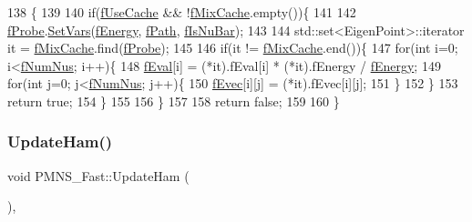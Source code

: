 \begin{DoxyCode}
138 \{
139 
140   \textcolor{keywordflow}{if}(\hyperlink{classOscProb_1_1PMNS__Base_ad28c12ef897b5555eda509ea55c99107}{fUseCache} && !\hyperlink{classOscProb_1_1PMNS__Base_a8159424f20197a3a7145fe3bf2c11176}{fMixCache}.empty())\{
141 
142     \hyperlink{classOscProb_1_1PMNS__Base_ab1fe4800ee3ae48df4fc942dce00e0d3}{fProbe}.\hyperlink{structOscProb_1_1EigenPoint_a2e293e0820715950ec8fb370e8cc9477}{SetVars}(\hyperlink{classOscProb_1_1PMNS__Base_a2800af6d436972f3e900867790c046b0}{fEnergy}, \hyperlink{classOscProb_1_1PMNS__Base_a849437aa8891fe042e86886ce8f81c6e}{fPath}, \hyperlink{classOscProb_1_1PMNS__Base_a0ebaeaefab36a3ff381c6293faedfdd6}{fIsNuBar});
143     
144     std::set<EigenPoint>::iterator it = \hyperlink{classOscProb_1_1PMNS__Base_a8159424f20197a3a7145fe3bf2c11176}{fMixCache}.find(\hyperlink{classOscProb_1_1PMNS__Base_ab1fe4800ee3ae48df4fc942dce00e0d3}{fProbe});
145 
146     \textcolor{keywordflow}{if}(it != \hyperlink{classOscProb_1_1PMNS__Base_a8159424f20197a3a7145fe3bf2c11176}{fMixCache}.end())\{
147       \textcolor{keywordflow}{for}(\textcolor{keywordtype}{int} i=0; i<\hyperlink{classOscProb_1_1PMNS__Base_a24bb74bed63569dfe88b18fa6a08060e}{fNumNus}; i++)\{
148         \hyperlink{classOscProb_1_1PMNS__Base_a6319c34d7decbb9d7d6da279c06e8c2d}{fEval}[i] = (*it).fEval[i] * (*it).fEnergy / \hyperlink{classOscProb_1_1PMNS__Base_a2800af6d436972f3e900867790c046b0}{fEnergy};
149         \textcolor{keywordflow}{for}(\textcolor{keywordtype}{int} j=0; j<\hyperlink{classOscProb_1_1PMNS__Base_a24bb74bed63569dfe88b18fa6a08060e}{fNumNus}; j++)\{
150           \hyperlink{classOscProb_1_1PMNS__Base_a87be137356c5f27ab83cab5e1298ef8f}{fEvec}[i][j] = (*it).fEvec[i][j];
151         \}
152       \}
153       \textcolor{keywordflow}{return} \textcolor{keyword}{true};
154     \}
155 
156   \}
157   
158   \textcolor{keywordflow}{return} \textcolor{keyword}{false};
159 
160 \}
\end{DoxyCode}
\mbox{\label{classOscProb_1_1PMNS__Fast_a16248082308f9d2c332ebf1be0aa90c3}} 
\subsubsection{\texorpdfstring{Update\+Ham()}{UpdateHam()}}
{\footnotesize\ttfamily void P\+M\+N\+S\+\_\+\+Fast\+::\+Update\+Ham (\begin{DoxyParamCaption}{ }\end{DoxyParamCaption})\hspace{0.3cm}{\ttfamily [protected]}, {\ttfamily [virtual]}}

